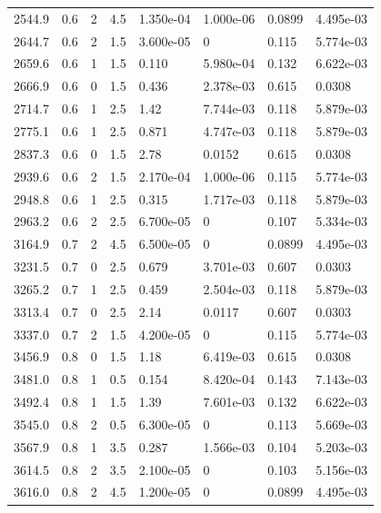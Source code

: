 \documentclass[preview]{standalone}
\begin{document}
{{{\begin{tabular}{L{1.2cm}C{1.2cm} C{0.3cm}C{0.5cm} C{1.4cm}C{1.4cm} C{1.4cm}C{1.4cm}}
  2544.9  &   0.6  & 2     & 4.5 &  1.350e-04  & 1.000e-06  & 0.0899 &  4.495e-03   \\ 
  2644.7  &   0.6  & 2     & 1.5 &  3.600e-05  & 0  & 0.115 &  5.774e-03   \\ 
  2659.6  &   0.6  & 1     & 1.5 &  0.110  & 5.980e-04  & 0.132 &  6.622e-03   \\ 
  2666.9  &   0.6  & 0     & 1.5 &  0.436  & 2.378e-03  & 0.615 &  0.0308   \\ 
  2714.7  &   0.6  & 1     & 2.5 &  1.42  & 7.744e-03  & 0.118 &  5.879e-03   \\ 
  2775.1  &   0.6  & 1     & 2.5 &  0.871  & 4.747e-03  & 0.118 &  5.879e-03   \\ 
  2837.3  &   0.6  & 0     & 1.5 &  2.78  & 0.0152  & 0.615 &  0.0308   \\ 
  2939.6  &   0.6  & 2     & 1.5 &  2.170e-04  & 1.000e-06  & 0.115 &  5.774e-03   \\ 
  2948.8  &   0.6  & 1     & 2.5 &  0.315  & 1.717e-03  & 0.118 &  5.879e-03   \\ 
  2963.2  &   0.6  & 2     & 2.5 &  6.700e-05  & 0  & 0.107 &  5.334e-03   \\ 
  3164.9  &   0.7  & 2     & 4.5 &  6.500e-05  & 0  & 0.0899 &  4.495e-03   \\ 
  3231.5  &   0.7  & 0     & 2.5 &  0.679  & 3.701e-03  & 0.607 &  0.0303   \\ 
  3265.2  &   0.7  & 1     & 2.5 &  0.459  & 2.504e-03  & 0.118 &  5.879e-03   \\ 
  3313.4  &   0.7  & 0     & 2.5 &  2.14  & 0.0117  & 0.607 &  0.0303   \\ 
  3337.0  &   0.7  & 2     & 1.5 &  4.200e-05  & 0  & 0.115 &  5.774e-03   \\ 
  3456.9  &   0.8  & 0     & 1.5 &  1.18  & 6.419e-03  & 0.615 &  0.0308   \\ 
  3481.0  &   0.8  & 1     & 0.5 &  0.154  & 8.420e-04  & 0.143 &  7.143e-03   \\ 
  3492.4  &   0.8  & 1     & 1.5 &  1.39  & 7.601e-03  & 0.132 &  6.622e-03   \\ 
  3545.0  &   0.8  & 2     & 0.5 &  6.300e-05  & 0  & 0.113 &  5.669e-03   \\ 
  3567.9  &   0.8  & 1     & 3.5 &  0.287  & 1.566e-03  & 0.104 &  5.203e-03   \\ 
  3614.5  &   0.8  & 2     & 3.5 &  2.100e-05  & 0  & 0.103 &  5.156e-03   \\ 
  3616.0  &   0.8  & 2     & 4.5 &  1.200e-05  & 0  & 0.0899 &  4.495e-03   \\ 

\end{tabular}}}}
\end{document}
